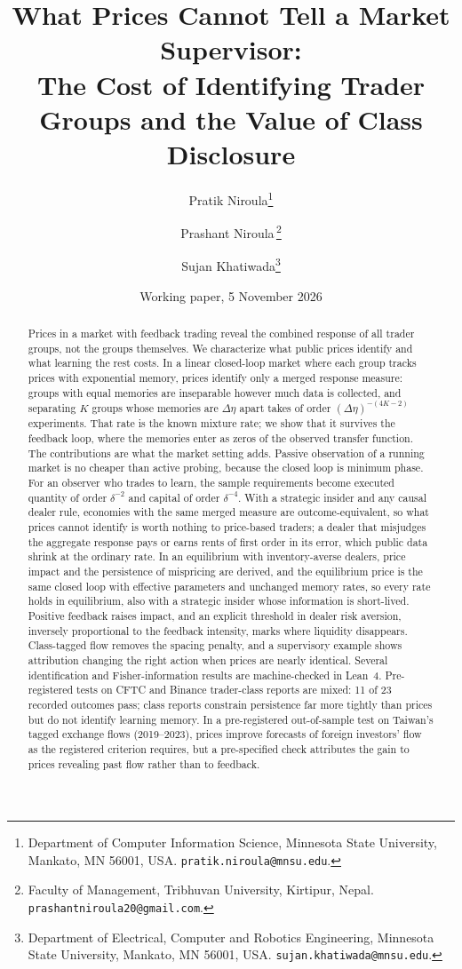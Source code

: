 \documentclass[12pt]{article}
\title{What Prices Cannot Tell a Market Supervisor:\\ The Cost of Identifying Trader Groups and the Value of Class Disclosure}
\author{Pratik Niroula\thanks{Department of Computer Information Science, Minnesota State University, Mankato, MN 56001, USA. \texttt{pratik.niroula@mnsu.edu}.}
\and Prashant Niroula\,\thanks{Faculty of Management, Tribhuvan University, Kirtipur, Nepal. \texttt{prashantniroula20@gmail.com}.}
\and Sujan Khatiwada\thanks{Department of Electrical, Computer and Robotics Engineering, Minnesota State University, Mankato, MN 56001, USA. \texttt{sujan.khatiwada@mnsu.edu}.}}
\date{Working paper, 5 November 2026}
\theoremstyle{definition}
\theoremstyle{remark}
\begin{document}
\maketitle
\thispagestyle{empty}
\begingroup\onehalfspacing

\begin{abstract}
\noindent Prices in a market with feedback trading reveal the combined response of all trader groups, not the groups themselves. We characterize what public prices identify and what learning the rest costs. In a linear closed-loop market where each group tracks prices with exponential memory, prices identify only a merged response measure: groups with equal memories are inseparable however much data is collected, and separating $K$ groups whose memories are $\Delta\eta$ apart takes of order $(\Delta\eta)^{-(4K-2)}$ experiments. That rate is the known mixture rate; we show that it survives the feedback loop, where the memories enter as zeros of the observed transfer function. The contributions are what the market setting adds. Passive observation of a running market is no cheaper than active probing, because the closed loop is minimum phase. For an observer who trades to learn, the sample requirements become executed quantity of order $\delta^{-2}$ and capital of order $\delta^{-4}$. With a strategic insider and any causal dealer rule, economies with the same merged measure are outcome-equivalent, so what prices cannot identify is worth nothing to price-based traders; a dealer that misjudges the aggregate response pays or earns rents of first order in its error, which public data shrink at the ordinary rate. In an equilibrium with inventory-averse dealers, price impact and the persistence of mispricing are derived, and the equilibrium price is the same closed loop with effective parameters and unchanged memory rates, so every rate holds in equilibrium, also with a strategic insider whose information is short-lived. Positive feedback raises impact, and an explicit threshold in dealer risk aversion, inversely proportional to the feedback intensity, marks where liquidity disappears. Class-tagged flow removes the spacing penalty, and a supervisory example shows attribution changing the right action when prices are nearly identical. Several identification and Fisher-information results are machine-checked in Lean~4. Pre-registered tests on CFTC and Binance trader-class reports are mixed: 11 of 23 recorded outcomes pass; class reports constrain persistence far more tightly than prices but do not identify learning memory. In a pre-registered out-of-sample test on Taiwan's tagged exchange flows (2019--2023), prices improve forecasts of foreign investors' flow as the registered criterion requires, but a pre-specified check attributes the gain to prices revealing past flow rather than to feedback.
\end{abstract}
\end{document}
